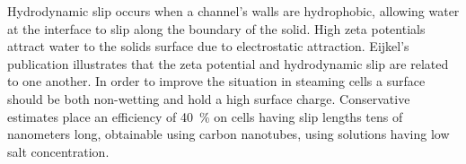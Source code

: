   Hydrodynamic slip occurs when a channel's walls are hydrophobic, allowing water at the interface to slip along the boundary of the solid.
  High zeta potentials attract water to the solids surface due to electrostatic attraction.
  Eijkel's publication illustrates that the zeta potential and hydrodynamic slip are related to one another. 
  In order to improve the situation in steaming cells a surface should be both non-wetting and hold a high surface charge.
  Conservative estimates place an efficiency of \SI{40}{\percent} on cells having slip lengths tens of nanometers long, obtainable using carbon nanotubes, using solutions having low salt concentration.









